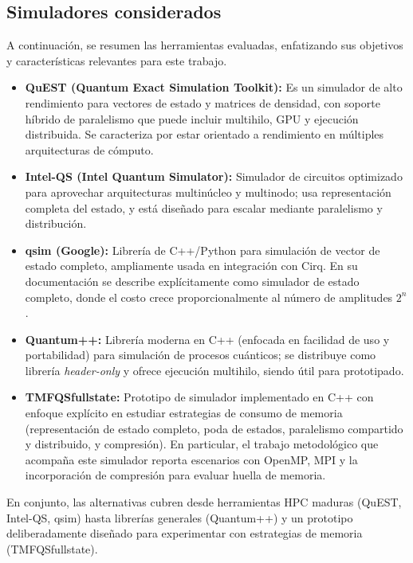 \subsection{Simuladores considerados}

A continuación, se resumen las herramientas evaluadas, enfatizando sus objetivos y características relevantes para este trabajo.

\begin{itemize}
    \item \textbf{QuEST (Quantum Exact Simulation Toolkit):} Es un simulador de alto rendimiento para vectores de estado y matrices de densidad, con soporte híbrido de paralelismo que puede incluir multihilo, GPU y ejecución distribuida. Se caracteriza por estar orientado a rendimiento en múltiples arquitecturas de cómputo. \cite{Jones2019, quest_repo}

    \item \textbf{Intel-QS (Intel Quantum Simulator):} Simulador de circuitos optimizado para aprovechar arquitecturas multinúcleo y multinodo; usa representación completa del estado, y está diseñado para escalar mediante paralelismo y distribución. \cite{intelqs_doc}

    \item \textbf{qsim (Google):} Librería de C++/Python para simulación de vector de estado completo, ampliamente usada en integración con Cirq. En su documentación se describe explícitamente como simulador de estado completo, donde el costo crece proporcionalmente al número de amplitudes $2^n$. \cite{qsim_repo, qsim_cirq}

    \item \textbf{Quantum++:} Librería moderna en C++ (enfocada en facilidad de uso y portabilidad) para simulación de procesos cuánticos; se distribuye como librería \emph{header-only} y ofrece ejecución multihilo, siendo útil para prototipado. \cite{qpp_paper}

    \item \textbf{TMFQSfullstate:} Prototipo de simulador implementado en C++ con enfoque explícito en estudiar estrategias de consumo de memoria (representación de estado completo, poda de estados, paralelismo compartido y distribuido, y compresión). En particular, el trabajo metodológico que acompaña este simulador reporta escenarios con OpenMP, MPI y la incorporación de compresión para evaluar huella de memoria. \cite{diaz2024software, diaz_mdpi_mmss, tmfqs_repo}
\end{itemize}

En conjunto, las alternativas cubren desde herramientas HPC maduras (QuEST, Intel-QS, qsim) hasta librerías generales (Quantum++) y un prototipo deliberadamente diseñado para experimentar con estrategias de memoria (TMFQSfullstate).
